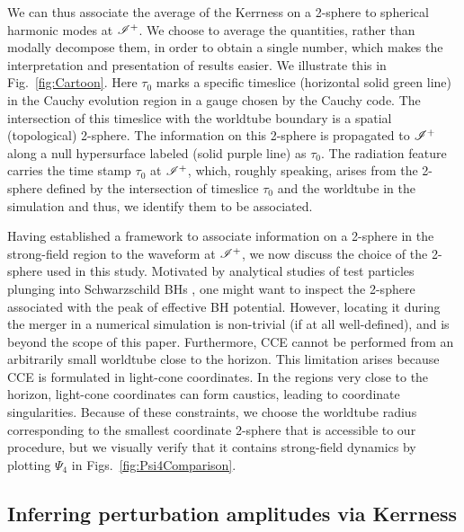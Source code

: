  
 We can thus associate the average of the Kerrness on a 2-sphere to spherical harmonic modes at $\mathscr{I^+}$. We choose to average the quantities, rather than modally decompose them, in order to obtain a single number, which makes the interpretation and presentation of results easier. We illustrate this in Fig.~\ref{fig:Cartoon}. Here $\tau_{0}$ marks a specific timeslice  (horizontal solid green line) in the Cauchy evolution region in a gauge chosen by the Cauchy code. The intersection of this timeslice with the worldtube boundary is a spatial (topological) 2-sphere. The information on this 2-sphere is propagated to $\mathscr{I^+}$ along a null hypersurface labeled (solid purple line) as $\tau_{0}$. The radiation feature carries the time stamp $\tau_{0}$ at $\mathscr{I^+}$, which, roughly speaking, arises from the 2-sphere defined by the intersection of timeslice $\tau_{0}$ and the worldtube in the simulation and thus, we identify them to be associated.  %

Having established a framework to associate information on a 2-sphere in the strong-field region to the waveform at $\mathscr{I^+}$, we now discuss the choice of the 2-sphere used in this study. Motivated by analytical studies of test particles plunging into Schwarzschild BHs \cite{PriceAndPlunge,PriceAndPlunge2}, one might want to inspect the 2-sphere associated with the peak of effective BH potential. However, locating it during the merger in a numerical simulation is non-trivial (if at all well-defined), and is beyond the scope of this paper. Furthermore, CCE cannot be performed from an arbitrarily small worldtube close to the horizon. This limitation arises because CCE is formulated in light-cone coordinates. In the regions very close to the horizon, light-cone coordinates can form caustics, leading to coordinate singularities. Because of these constraints, we choose the worldtube radius corresponding to the smallest coordinate  2-sphere that is accessible to our procedure, but we visually verify that it contains strong-field dynamics by plotting $\Psi_{4}$ in Figs.~\ref{fig:Psi4Comparison}.

\subsection{Inferring perturbation amplitudes via Kerrness}
\EnvelopesFigure
\KerrPertAmplitudeFigure

